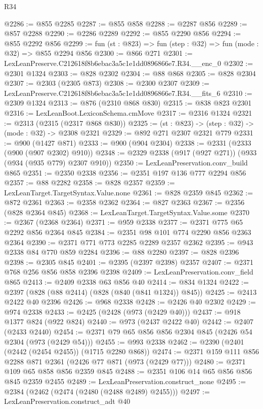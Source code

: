 \begin{lexlean}{R34}
\begin{coremodule}
@2286 := @855 @2285
@2287 := @855 @858
@2288 := @2287 @856
@2289 := @857 @2288
@2290 := @2286 @2289
@2292 := @855 @2290 @856
@2294 := @855 @2292 @856
@2299 := fun (st : @823) => fun (step : @32) => fun (mode : @32) => @855 @2294 @856
@2300 := @866 @271
@2301 := LexLeanPreserve.C212618f8b6ebac3a5c1e1dd0896866e7.R34.__enc_0
@2302 := @2301 @1324
@2303 := @828 @2302
@2304 := @88 @868
@2305 := @828 @2304
@2307 := @2303 (@2305 @873)
@2308 := @2300 @2307
@2309 := LexLeanPreserve.C212618f8b6ebac3a5c1e1dd0896866e7.R34.__fits_6
@2310 := @2309 @1324
@2313 := @876 (@2310 @868 @830)
@2315 := @838 @823 @2301
@2316 := LexLeanBoot.LexiconSchema.cmMove
@2317 := @2316 @1324
@2321 := @2313 (@2315 (@2317 @868 @830))
@2325 := (st : @823) -> (step : @32) -> (mode : @32) -> @2308 @2321
@2329 := @892 @271 @2307 @2321 @779
@2331 := @900 (@1427 @871)
@2333 := @900 (@904 @2304)
@2338 := @2331 (@2333 (@900 (@907 @2302) @910))
@2348 := @2329 @2338 (@917 (@927 @271)) (@933 (@934 (@935 @779) @2307 @910))
@2350 := LexLeanPreservation.conv_build @865
@2351 := @2350 @2338
@2356 := @2351 @197 @136 @777 @2294 @856
@2357 := @88 @2282
@2358 := @828 @2357
@2359 := LexLeanTarget.TargetSyntax.Value.none
@2361 := @828 @2359 @845
@2362 := @872 @2361
@2363 := @2358 @2362
@2364 := @827 @2363
@2367 := @2356 (@828 @2364 @845)
@2368 := LexLeanTarget.TargetSyntax.Value.some
@2370 := @2367 (@2368 @2364)
@2371 := @959 @2338
@2377 := @2371 @775 @65 @2292 @856 @2364 @845
@2384 := @2351 @98 @101 @774 @2290 @856 @2363 @2364
@2390 := @2371 @771 @773 @2285 @2289 @2357 @2362
@2395 := @943 @2338 @84 @770 @859 @2284
@2396 := @88 @2280
@2397 := @828 @2396
@2398 := @2305 @845
@2401 := @2395 (@2397 @2398) @2357
@2407 := @2371 @768 @256 @856 @858 @2396 @2398
@2409 := LexLeanPreservation.conv_field @865
@2413 := @2409 @2338 @63 @856 @40
@2414 := @834 @1324
@2422 := @2397 (@828 (@88 @2414) (@828 (@840 (@841 @1324)) @845))
@2425 := @2413 @2422 @40 @2396
@2426 := @968 @2338
@2428 := @2426 @40 @2302
@2429 := @974 @2338
@2433 := @2425 (@2428 (@973 (@2429 @40)))
@2437 := @918 @1377 @824 (@922 @824)
@2440 := @973 (@2437 @2422 @40)
@2442 := @2407 (@2433 @2440)
@2454 := @2371 @79 @65 @856 @856 @2304 @845 (@2426 @54 @2304 (@973 (@2429 @54)))
@2455 := @993 @2338
@2462 := @2390 (@2401 (@2442 (@2454 @2455)) (@1715 @2280 @868))
@2474 := @2371 @159 @111 @856 @2288 @871 @2361 (@2426 @77 @871 (@973 (@2429 @77)))
@2480 := @2371 @109 @65 @858 @856 @2359 @845
@2488 := @2351 @106 @14 @65 @856 @856 @845 @2359 @2455
@2489 := LexLeanPreservation.construct_none
@2495 := @2384 (@2462 (@2474 (@2480 (@2488 @2489) @2455)))
@2497 := LexLeanPreservation.construct_adt @40

\end{coremodule}
\end{lexlean}
